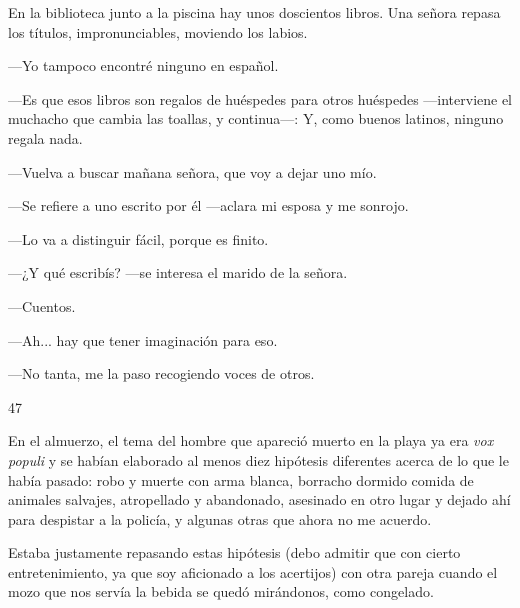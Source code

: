 \documentclass[12pt,twoside,openright,a5paper]{book}
\begin{document}
\nopagebreak

\vspace{0.5cm}

\nopagebreak

En la biblioteca junto a la piscina hay unos doscientos libros.  Una señora
repasa los títulos, impronunciables, moviendo los labios.

---Yo tampoco encontré ninguno en español.

---Es que esos libros son regalos de huéspedes para otros huéspedes
---interviene el muchacho que cambia las toallas, y continua---: Y, como buenos latinos, ninguno
regala nada.

---Vuelva a buscar mañana señora, que voy a dejar uno mío.

---Se refiere a uno escrito por él ---aclara mi esposa y me sonrojo.

---Lo va a distinguir fácil, porque es finito.

---¿Y qué escribís? ---se interesa el marido de la señora.

---Cuentos.

---Ah... hay que tener imaginación para eso.

---No tanta, me la paso recogiendo voces de otros.

\vspace{0.5cm}

\hrulefill \hspace{0.1cm}\decofourleft\hspace{0.2cm} 47 \hspace{0.2cm}\decofourright \hspace{0.1cm}\hrulefill

\nopagebreak

\vspace{0.5cm}

\nopagebreak

En el almuerzo, el tema del hombre que apareció muerto en la playa ya era
\emph{vox populi} y se habían elaborado al menos diez hipótesis diferentes
acerca de lo que le había pasado: robo y muerte con arma blanca, borracho
dormido comida de animales salvajes, atropellado y abandonado, asesinado
en otro lugar y dejado ahí para despistar a la policía, y algunas otras
que ahora no me acuerdo.

Estaba justamente repasando estas hipótesis (debo admitir que con cierto
entretenimiento, ya que soy aficionado a los acertijos) con otra
pareja cuando el mozo que nos servía la bebida se quedó mirándonos,
como congelado. 
\end{document}
